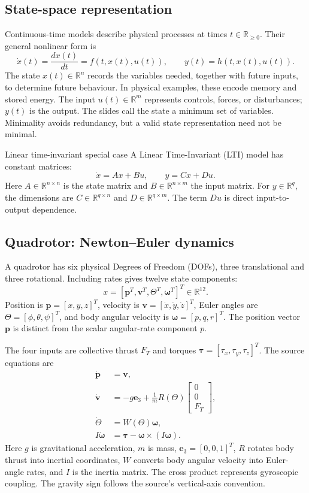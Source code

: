 \documentclass[11pt,a4paper]{article}
\numberwithin{equation}{section}
\numberwithin{figure}{section}
\numberwithin{table}{section}
\newcommand{\R}{\mathbb{R}}
\begin{document}
\subsection{State-space representation}
Continuous-time models describe physical processes at times $t\in\R_{\ge0}$. Their general nonlinear form is
\begin{equation}\label{eq:ctgeneral}
\dot x(t)=\frac{dx(t)}{dt}=f(t,x(t),u(t)),\qquad y(t)=h(t,x(t),u(t)).
\end{equation}
The state $x(t)\in\R^n$ records the variables needed, together with future inputs, to determine future behaviour. In physical examples, these encode memory and stored energy. The input $u(t)\in\R^m$ represents controls, forces, or disturbances; $y(t)$ is the output. The slides call the state a minimum set of variables. Minimality avoids redundancy, but a valid state representation need not be minimal.

\begin{concept}{Linear time-invariant special case}
A Linear Time-Invariant (LTI) model has constant matrices:
\[\dot x=Ax+Bu,\qquad y=Cx+Du.\]
Here $A\in\R^{n\times n}$ is the state matrix and $B\in\R^{n\times m}$ the input matrix. For $y\in\R^q$, the dimensions are $C\in\R^{q\times n}$ and $D\in\R^{q\times m}$. The term $Du$ is direct input-to-output dependence.
\end{concept}

\subsection{Quadrotor: Newton--Euler dynamics}
A quadrotor has six physical Degrees of Freedom (DOFs), three translational and three rotational. Including rates gives twelve state components:
\[x=[\mathbf p^T,\mathbf v^T,\Theta^T,\boldsymbol\omega^T]^T\in\R^{12}.\]
Position is $\mathbf p=[x,y,z]^T$, velocity is $\mathbf v=[\dot x,\dot y,\dot z]^T$, Euler angles are $\Theta=[\phi,\theta,\psi]^T$, and body angular velocity is $\boldsymbol\omega=[p,q,r]^T$. The position vector $\mathbf p$ is distinct from the scalar angular-rate component $p$.

The four inputs are collective thrust $F_T$ and torques $\boldsymbol\tau=[\tau_x,\tau_y,\tau_z]^T$. The source equations are
\begin{align}
\dot{\mathbf p}&=\mathbf v,\\
\dot{\mathbf v}&=-g\mathbf e_3+\frac1m R(\Theta)\begin{bmatrix}0\\0\\F_T\end{bmatrix},\label{eq:quadtrans}\\
\dot\Theta&=W(\Theta)\boldsymbol\omega,\\
I\dot{\boldsymbol\omega}&=\boldsymbol\tau-\boldsymbol\omega\times(I\boldsymbol\omega).\label{eq:quadrot}
\end{align}
Here $g$ is gravitational acceleration, $m$ is mass, $\mathbf e_3=[0,0,1]^T$, $R$ rotates body thrust into inertial coordinates, $W$ converts body angular velocity into Euler-angle rates, and $I$ is the inertia matrix. The cross product represents gyroscopic coupling. The gravity sign follows the source's vertical-axis convention.
\end{document}
